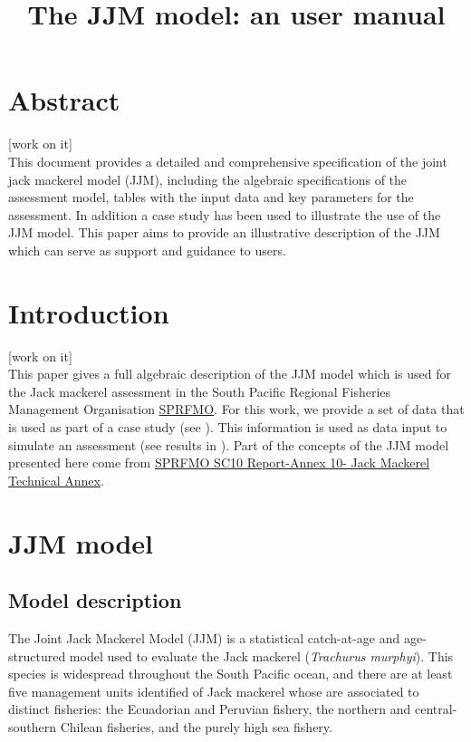 \documentclass{article}
\title{The JJM model: an user manual}
\date{\parbox{\linewidth}{\centering%
  \skip
  Mirian GERONIMO \hspace*{3cm} Criscely LUJAN \endgraf\medskip
  Instituto del Mar del Perú (IMARPE)}
  }
\begin{document}
\maketitle

\tableofcontents
\newpage

\section*{Abstract} 
[work on it] \\
This document provides a detailed and comprehensive specification of the joint jack mackerel model (JJM), including the algebraic specifications of the assessment model, tables with the input data and key parameters for the assessment. In addition a case study has been used to illustrate the use of the JJM model. This paper aims to provide an illustrative description of the JJM which can serve as support and guidance to users.

\section{Introduction} 

[work on it] \\
This paper gives a full algebraic description of the JJM model which is used for the Jack mackerel assessment in the South Pacific Regional Fisheries Management Organisation \href{https://www.sprfmo.int/}{SPRFMO}. For this work, we provide a set of data that is used as part of a case study (see ). This information is used as data input to simulate an assessment (see results in ). Part of the concepts of the JJM model presented here come from \href{https://www.sprfmo.int/assets/Meetings/SC/10th-SC-2022/Report-and-Annexes/Annex-8-JM-Technical-Advice-CV_2.pdf}{SPRFMO SC10 Report-Annex 10- Jack Mackerel Technical Annex}.

\section{JJM model}

\subsection{Model description}

The Joint Jack Mackerel Model (JJM) is a statistical catch-at-age and age-structured model used to evaluate the Jack mackerel (\textit{Trachurus murphyi}). This species is widespread throughout the South Pacific ocean, and there are at least five management units identified of Jack mackerel whose are associated to distinct fisheries: the Ecuadorian and Peruvian fishery, the northern and central-southern Chilean fisheries, and the purely high sea fishery. 
\end{document}
